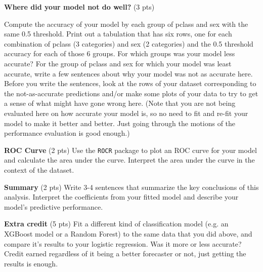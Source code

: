 \documentclass{article}\usepackage[]{graphicx}\usepackage[]{color}
\begin{document}
\begin{exercise}
{\bf Where did your model not do well?}  (3 pts) 

Compute the accuracy of your model by each group of pclass and sex with the same 0.5 threshold. Print out a tabulation that has six rows, one for each combination of pclass (3 categories) and sex (2 categories) and the 0.5 threshold accuracy for each of those 6 groups. For which groups was your model less accurate? For the group of pclass and sex for which your model was least accurate, write a few sentences about why your model was not as accurate here. Before you write the sentences, look at the rows of your dataset corresponding to the not-as-accurate predictions and/or make some plots of your data to try to get a sense of what might have gone wrong here. (Note that you are not being evaluated here on how accurate your model is, so no need to fit and re-fit your model to make it better and better. Just going through the motions of the performance evaluation is good enough.)




\end{exercise}




\begin{exercise}
{\bf ROC Curve} (2 pts)
Use the {\tt ROCR} package to plot an ROC curve for your model and calculate the area under the curve. Interpret the area under the curve in the context of the dataset.



\end{exercise}


\begin{exercise}
{\bf Summary} (2 pts)
Write 3-4 sentences that summarize the key conclusions of this analysis. Interpret the coefficients from your fitted model and describe your model's predictive performance. 

\end{exercise}


{\bf Extra credit}  (5 pts) 
Fit a different kind of classification model (e.g. an XGBoost model or a Random Forest) to the same data that you did above, and compare it's results to your logistic regression. Was it more or less accurate? Credit earned regardless of it being a better forecaster or not, just getting the results is enough.
\end{document}
